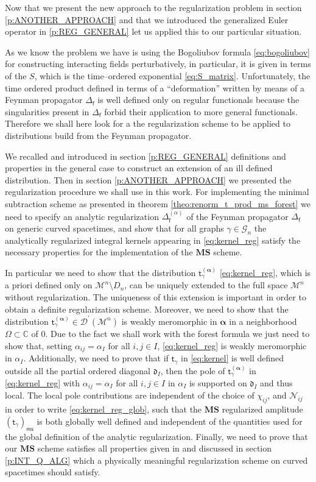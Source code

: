 \documentclass[11pt]{book}
\newcommand{\ms}{\mathsf{ms}}
\newcommand{\MS}{\textbf{MS}}
\newcommand{\alphabd}{\boldsymbol{\alpha}}
\newcommand{\Dcal}{\mathcal{D}}
\newcommand{\Gcal}{\mathcal{G}}
\newcommand{\Mcal}{\mathcal{M}}
\newcommand{\Ncal}{\mathcal{N}}
\newcommand{\Cbb}{\mathbb{C}}
\newcommand{\drak}{\mathfrak{d}}
\newcommand{\fsf}{\mathsf{f}}
\newcommand{\tsf}{\mathsf{t}}
\theoremstyle{break}
\begin{document}
Now that we present the new approach to the regularization problem in section \ref{p:ANOTHER_APPROACH} and that we introduced the generalized Euler operator in \ref{p:REG_GENERAL} let us applied this to our particular situation.


As we know the problem we have is using the Bogoliubov formula \eqref{eq:bogoliubov} for constructing interacting fields perturbatively, in particular, it is given in terms of the $S$, which is the time--ordered exponential \eqref{eq:S_matrix}. Unfortunately, the time ordered product defined in terms of a ``deformation'' written by means of a Feynman propagator $\Delta_\fsf$ is well defined only on regular functionals because the singularities present in $\Delta_\fsf$ forbid their application to more general functionals. Therefore we shall here look for a the regularization scheme to be applied to distributions build from the Feynman propagator.


We recalled and introduced in section \ref{p:REG_GENERAL} definitions and properties in the general case to construct an extension of an ill defined distribution. Then in section \ref{p:ANOTHER_APPROACH} we presented the regularization procedure we shall use in this work. For implementing the minimal subtraction scheme as presented in theorem \ref{theo:renorm_t_prod_ms_forest} we need to specify an analytic regularization $\Delta^{(\alpha)}_\fsf$ of the Feynman propagator $\Delta_\fsf$ on generic curved spacetimes, and show that for all graphs $\gamma \in \Gcal_n$ the analytically regularized integral kernels appearing in \eqref{eq:kernel_reg} satisfy the necessary properties for the implementation of the $\MS$ scheme.


In particular we need to show that the distribution $\tsf^{(\alphabd)}_\gamma$ \eqref{eq:kernel_reg}, which is a priori defined only on $\Mcal^n \setminus D_n$, can be uniquely extended to the full space $\Mcal^n$ without regularization. The uniqueness of this extension is important in order to obtain a definite regularization scheme. Moreover, we need to show that the distribution $\tsf^{(\alphabd)}_\gamma \in \Dcal^\prime(\Mcal^n)$ is weakly meromorphic in $\alphabd$ in a neighborhood $\Omega \subset \Cbb$ of 0. Due to the fact we shall work with the forest formula we just need to show that, setting $\alpha_{ij} = \alpha_I$ for all $i,j\in I$, \eqref{eq:kernel_reg} is weakly meromorphic in $\alpha_I$. Additionally, we need to prove that if $\tsf_\gamma$ in \eqref{eq:kernel} is well defined outside all the partial ordered diagonal $\drak_I$, then the pole of $\tsf^{(\alphabd)}_\gamma$ in \eqref{eq:kernel_reg} with $\alpha_{ij} = \alpha_I$ for all $i,j\in I$ in $\alpha_I$ is supported on $\drak_I$ and thus local. The local pole contributions are independent of the choice of $\chi_{ij}$, and $\Ncal_{ij}$ in order to write \eqref{eq:kernel_reg_glob}, such that the $\MS$ regularized amplitude $(\tsf_\gamma)_\ms$ is both globally well defined and independent of the quantities used for the global definition of the analytic regularization. Finally, we need to prove that our $\MS$ scheme satisfies all properties given in \cite{HW_2001,HW_2002} and discussed in section \ref{p:INT_Q_ALG} which a physically meaningful regularization scheme on curved spacetimes should satisfy.
\end{document}
